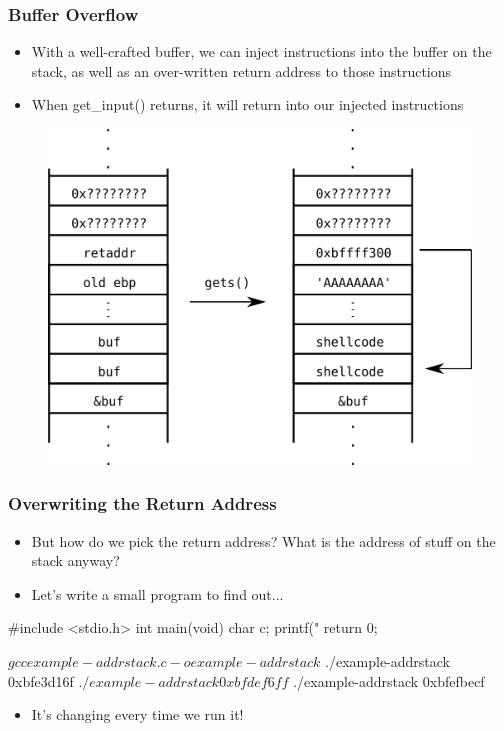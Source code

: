 \documentclass[11pt,xcolor=dvipsnames]{beamer}
\newcommand{\mvs}{\vspace{-0.95em}}
\begin{document}
\begin{frame}[fragile,t]
\frametitle{Buffer Overflow}
\mvs
\begin{itemize}
  \item With a well-crafted buffer, we can inject instructions into the buffer on the stack, as well as an over-written return address to those instructions
  \item When {\ttfamily get\_input()} returns, it will return into our injected instructions
\end{itemize}
\begin{figure}
\centering
\includegraphics[height=0.55\paperheight]{figures/bufferoverflow.png}
\end{figure}
\end{frame}

\begin{frame}[fragile,t]
\frametitle{Overwriting the Return Address}
\begin{itemize}
  \item But how do we pick the return address? What is the address of stuff on the stack anyway?
  \pause
  \item Let's write a small program to find out...
\end{itemize}
\begin{ccode}
#include <stdio.h>
int main(void) {
  char c;
  printf("%
  return 0;
}
\end{ccode}
\begin{textcode}
$ gcc example-addrstack.c -o example-addrstack
$ ./example-addrstack
0xbfe3d16f
$ ./example-addrstack
0xbfdef6ff
$ ./example-addrstack
0xbfefbecf
\end{textcode}
\pause
\begin{itemize}
  \item It's changing every time we run it!
\end{itemize}
\end{frame}
\end{document}
